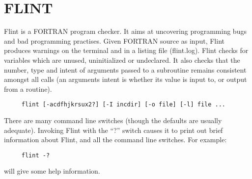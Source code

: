 \section{FLINT}
Flint is a FORTRAN program checker. It aims at uncovering programming
bugs and bad programming practises. Given FORTRAN source as input, Flint
produces warnings on the terminal and in a listing file (flint.log).
Flint checks for variables which are unused, uninitialized or
undeclared. It also checks that the number, type and intent of arguments
passed to a subroutine remains consistent amongst all calls (an arguments
intent is whether its  value is input to, or output from a routine).
\begin{verbatim}
     flint [-acdfhjkrsux2?] [-I incdir] [-o file] [-l] file ...
\end{verbatim}
There are many command line switches (though the defaults are usually adequate).
Invoking Flint with the ``?'' switch causes it to print out brief information
about Flint, and all the command line switches. For example:
\begin{verbatim}
     flint -?
\end{verbatim}
will give some help information.

